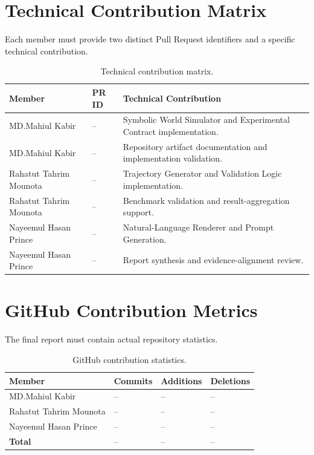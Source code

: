 \documentclass{iutbscthesis}
\begin{document}
\begin{appendices}
\section{Technical Contribution Matrix}
Each member must provide two distinct Pull Request identifiers and a specific technical contribution.
\begin{table}[H]
\centering
\small
\renewcommand{\arraystretch}{1.4}
\begin{tabular}{|p{}|p{}|p{}|}
\hline
\textbf{Member} & \textbf{PR ID} & \textbf{Technical Contribution} \\
\hline
MD.Mahiul Kabir & -- & Symbolic World Simulator and Experimental Contract implementation. \\
\hline
MD.Mahiul Kabir & -- & Repository artifact documentation and implementation validation. \\
\hline
Rahatut Tahrim Mounota & -- & Trajectory Generator and Validation Logic implementation. \\
\hline
Rahatut Tahrim Mounota & -- & Benchmark validation and result-aggregation support. \\
\hline
Nayeemul Hasan Prince & -- & Natural-Language Renderer and Prompt Generation. \\
\hline
Nayeemul Hasan Prince & -- & Report synthesis and evidence-alignment review. \\
\hline
\end{tabular}
\caption{Technical contribution matrix.}
\label{tab:technical-contributions}
\end{table}
\normalsize

\section{GitHub Contribution Metrics}
The final report must contain actual repository statistics.
\begin{table}[H]
\centering
\begin{tabular}{p{}p{}p{}p{}}
\toprule
\textbf{Member} & \textbf{Commits} & \textbf{Additions} & \textbf{Deletions} \\
\midrule
MD.Mahiul Kabir & -- & -- & -- \\
Rahatut Tahrim Mounota & -- & -- & -- \\
Nayeemul Hasan Prince & -- & -- & -- \\
\midrule
\textbf{Total} & -- & -- & -- \\
\bottomrule
\end{tabular}
\caption{GitHub contribution statistics.}
\label{tab:github-metrics}
\end{table}


\end{appendices}
\end{document}
